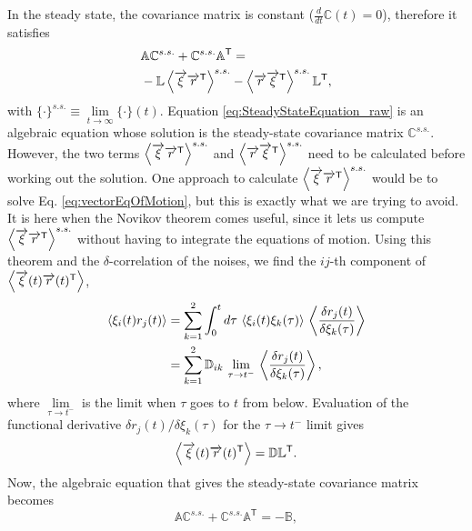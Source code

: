In the steady state, the covariance matrix is constant ($\frac{d}{dt}\mathbb{C}(t)=0$), therefore it satisfies
%
\begin{align}
  &\mathbb{A}\mathbb{C}^{s.s.} +
  \mathbb{C}^{s.s.} \mathbb{A}^\mathsf{T}=
  \nonumber\\
  &- \mathbb{L}\expval{ \overrightarrow{\xi}\overrightarrow{r}^\mathsf{T}}^{s.s.}
  - \expval{ \overrightarrow{r}\overrightarrow{\xi}^\mathsf{T}}^{s.s.}\mathbb{L}^\mathsf{T},
  \label{eq:SteadyStateEquation_raw}
\end{align}
%
with $\{\cdot\}^{s.s.}\equiv \lim\limits_{t \to \infty} \{\cdot\}(t)$. Equation \eqref{eq:SteadyStateEquation_raw} is an algebraic equation whose solution is the steady-state covariance matrix $\mathbb{C}^{s.s.}$. However, the two terms $\expval{ \overrightarrow{\xi}\overrightarrow{r}^\mathsf{T}}^{s.s.}$ and  $\expval{\overrightarrow{r}\overrightarrow{\xi}^\mathsf{T}}^{s.s.}$ need to be calculated before working out the solution. One approach to calculate $\expval{\overrightarrow{\xi}\overrightarrow{r}^\mathsf{T}}^{s.s.}$ would be to solve Eq. \eqref{eq:vectorEqOfMotion}, but this is exactly what we are trying to avoid. It is here when the Novikov theorem comes useful, since it lets us compute $\expval{ \overrightarrow{\xi}\overrightarrow{r}^\mathsf{T}}^{s.s.}$ without having to integrate the equations of motion. Using this theorem and the $\delta$-correlation of the noises, we find the $ij$-th component of $\expval{ \overrightarrow{\xi}(t)\overrightarrow{r}(t)^\mathsf{T}}$,
%
\begin{align}
  \expval{ \xi_i(t) r_j(t) } &= \sum_{k=1}^2 \int_0^t d\tau\,\expval{ \xi_i(t) \xi_k(\tau)}
  \,
  \expval{ \frac{\delta r_j(t)}{\delta \xi_k(\tau)} }\nonumber
  \\
  &= \sum_{k=1}^2 \mathbb{D}_{ik}
  \,
  \lim_{\tau \to t^{-}}
  \,
  \expval{ \frac{\delta r_j(t)}{\delta \xi_k(\tau)} },
\end{align}
%
where $\lim\limits_{\tau \to t^{-}}$ is the limit when $\tau$ goes to $t$ from below. Evaluation of the functional derivative ${\delta r_j(t)}/{\delta \xi_k(\tau)}$ for the $\tau \to t^{-}$ limit gives
%
\begin{equation}
  \expval{ \overrightarrow{\xi}(t)\overrightarrow{r}(t)^\mathsf{T}} = \mathbb{D}\mathbb{L}^\mathsf{T}.
\end{equation}
%
Now, the algebraic equation that gives the steady-state covariance matrix becomes
%
\begin{equation}
  \mathbb{A}\mathbb{C}^{s.s.} +
  \mathbb{C}^{s.s.}\mathbb{A}^\mathsf{T}
  =
  -\mathbb{B},
  \label{eq:SteadyStateEquationToyModel}
\end{equation}

